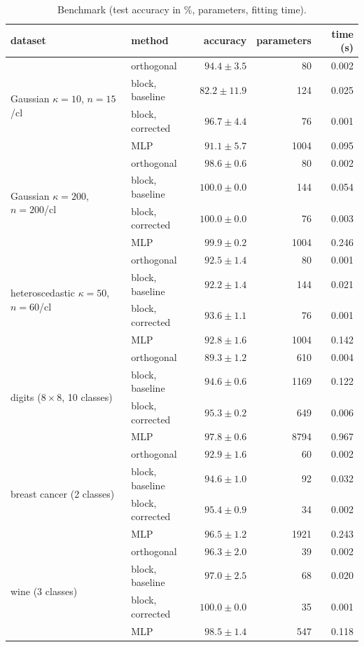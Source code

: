 \documentclass[11pt,a4paper]{article}
\theoremstyle{plain}
\theoremstyle{definition}
\theoremstyle{remark}
\begin{document}
\begin{table}[h]
\centering\small\renewcommand{\arraystretch}{1.12}
\caption{Benchmark (test accuracy in \%, parameters, fitting time).}
\label{tab:bench}
\begin{tabular}{@{}llrrr@{}}
\toprule
dataset & method & accuracy & parameters & time (s) \\
\midrule
\multirow{4}{*}{Gaussian $\kappa{=}10$, $n{=}15$/cl} & orthogonal & $94.4\pm3.5$ & 80 & 0.002 \\
 & block, baseline & $82.2\pm11.9$ & 124 & 0.025 \\
 & block, corrected & $96.7\pm4.4$ & 76 & 0.001 \\
 & MLP & $91.1\pm5.7$ & 1004 & 0.095 \\
\midrule
\multirow{4}{*}{Gaussian $\kappa{=}200$, $n{=}200$/cl} & orthogonal & $98.6\pm0.6$ & 80 & 0.002 \\
 & block, baseline & $100.0\pm0.0$ & 144 & 0.054 \\
 & block, corrected & $100.0\pm0.0$ & 76 & 0.003 \\
 & MLP & $99.9\pm0.2$ & 1004 & 0.246 \\
\midrule
\multirow{4}{*}{heteroscedastic $\kappa{=}50$, $n{=}60$/cl} & orthogonal & $92.5\pm1.4$ & 80 & 0.001 \\
 & block, baseline & $92.2\pm1.4$ & 144 & 0.021 \\
 & block, corrected & $93.6\pm1.1$ & 76 & 0.001 \\
 & MLP & $92.8\pm1.6$ & 1004 & 0.142 \\
\midrule
\multirow{4}{*}{digits ($8\times8$, 10 classes)} & orthogonal & $89.3\pm1.2$ & 610 & 0.004 \\
 & block, baseline & $94.6\pm0.6$ & 1169 & 0.122 \\
 & block, corrected & $95.3\pm0.2$ & 649 & 0.006 \\
 & MLP & $97.8\pm0.6$ & 8794 & 0.967 \\
\midrule
\multirow{4}{*}{breast cancer (2 classes)} & orthogonal & $92.9\pm1.6$ & 60 & 0.002 \\
 & block, baseline & $94.6\pm1.0$ & 92 & 0.032 \\
 & block, corrected & $95.4\pm0.9$ & 34 & 0.002 \\
 & MLP & $96.5\pm1.2$ & 1921 & 0.243 \\
\midrule
\multirow{4}{*}{wine (3 classes)} & orthogonal & $96.3\pm2.0$ & 39 & 0.002 \\
 & block, baseline & $97.0\pm2.5$ & 68 & 0.020 \\
 & block, corrected & $100.0\pm0.0$ & 35 & 0.001 \\
 & MLP & $98.5\pm1.4$ & 547 & 0.118 \\
\bottomrule
\end{tabular}
\end{table}
\end{document}
